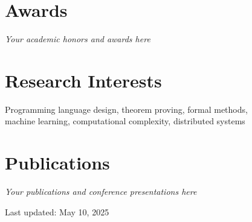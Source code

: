 \begin{multicols}{2}
\section*{Awards}
{\small\textit{Your academic honors and awards here}}


\section*{Research Interests}
{\small
Programming language design, theorem proving, formal methods, \\
machine learning, computational complexity, distributed systems
}


\section*{Publications}
{\small\textit{Your publications and conference presentations here}}

\end{multicols}

\vfill
{\footnotesize\color{subtext}\centering Last updated: May 10, 2025}

